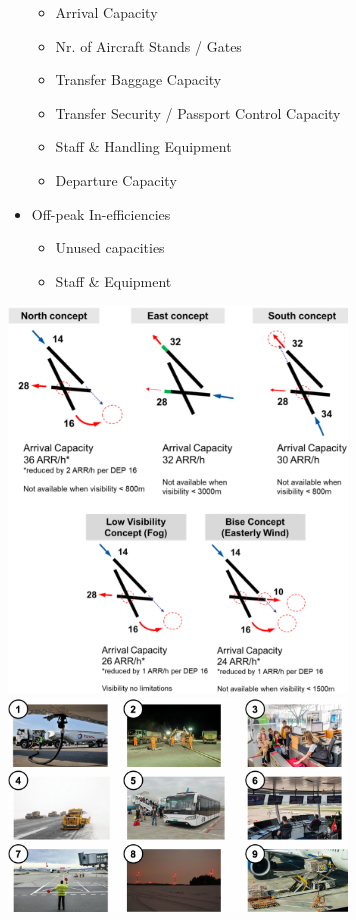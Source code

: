 \documentclass[9pt, landscape, fleqn]{scrartcl}
\begin{document}
\begin{multicols*}{3}
\begin{itemize}
    \begin{itemize}
        \item Arrival Capacity
        \item Nr. of Aircraft Stands / Gates
        \item Transfer Baggage Capacity
        \item Transfer Security / Passport Control Capacity
        \item Staff \& Handling Equipment
        \item Departure Capacity
    \end{itemize}
    \item Off-peak In-efficiencies 
    \begin{itemize}
        \item Unused capacities
        \item Staff \& Equipment
    \end{itemize}
\end{itemize}
\begin{center}
\includegraphics[width=9cm]{Images/Airport Concepts.png}
\includegraphics[width=9cm]{Images/Designations.png}

\end{center}
\end{multicols*}
\end{document}

